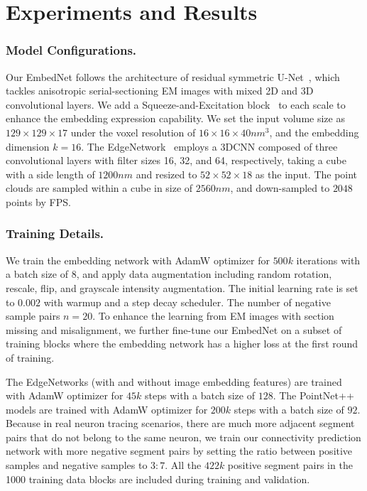 \section{Experiments and Results}
\label{Experiment}
 
\subsubsection{Model Configurations.} 
Our EmbedNet follows the architecture of residual symmetric U-Net~\cite{lee2017superhuman}, which tackles anisotropic serial-sectioning EM images with mixed 2D and 3D convolutional layers. We add a Squeeze-and-Excitation block~\cite{hu2018squeeze} to each scale to enhance the embedding expression capability. We set the input volume size as $129 \times 129 \times 17$ under the voxel resolution of $16\times16\times40 nm^3$, and the embedding dimension $k=16$. 
%
The EdgeNetwork~\cite{matejek2019biologically} employs a 3DCNN composed of three convolutional layers with filter sizes 16, 32, and 64, respectively, taking a cube with a side length of $1200nm$ and resized to $52\times52\times18$ as the input. The point clouds are sampled within a cube in size of $2560nm$, and down-sampled to $2048$ points by FPS.  
 

\subsubsection{Training Details.}
We train the embedding network with AdamW optimizer for $500k$ iterations with a batch size of $8$, and apply data augmentation including random rotation, rescale, flip, and grayscale intensity augmentation. The initial learning rate is set to $0.002$ with warmup and a step decay scheduler. 
The number of negative sample pairs $n=20$. 
%
To enhance the learning from EM images with section missing and misalignment, we further fine-tune our EmbedNet on a subset of training blocks where the embedding network has a higher loss at the first round of training.  

The EdgeNetworks (with and without image embedding features) are trained with AdamW optimizer for $45k$ steps with a batch size of $128$. The PointNet++ models are trained with AdamW optimizer for $200k$ steps with a batch size of $92$. 
Because in real neuron tracing scenarios, there are much more adjacent segment pairs that do not belong to the same neuron, we train our connectivity prediction network with more negative segment pairs by setting the ratio between positive samples and negative samples to $3:7$. 
All the $422k$ positive segment pairs in the 1000 training data blocks are included during training and validation.  


